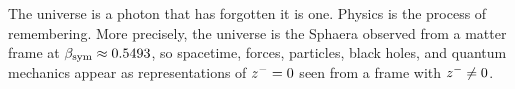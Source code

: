 \begin{remark}
The universe is a photon that has forgotten it is one. Physics is the
process of remembering. More precisely, the universe is the Sphaera
observed from a matter frame at $\beta_{\mathrm{sym}}\approx 0.5493$, so spacetime,
forces, particles, black holes, and quantum mechanics appear as
representations of $z^-=0$ seen from a frame with $z^-\neq 0$.
\end{remark}




